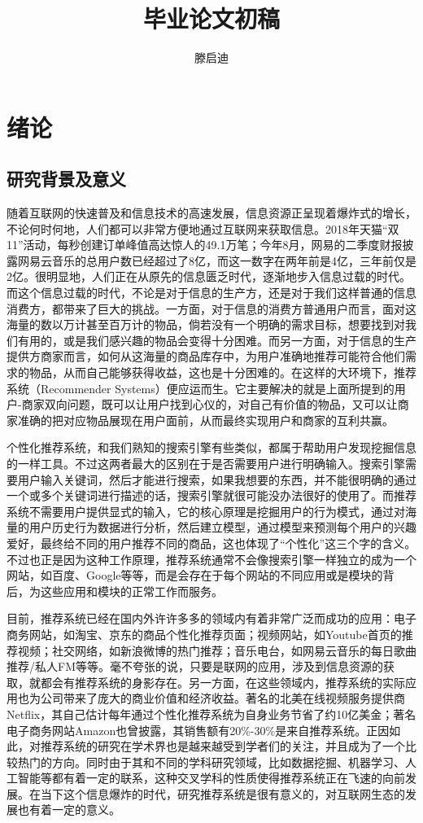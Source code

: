 \documentclass{article}
\title{毕业论文初稿}
\author{滕启迪}
\begin{document}
\maketitle
\tableofcontents
\newpage
\section{绪论}
	\subsection{研究背景及意义}
	随着互联网的快速普及和信息技术的高速发展，信息资源正呈现着爆炸式的增长，不论何时何地，人们都可以非常方便地通过互联网来获取信息。2018年天猫“双11”活动，每秒创建订单峰值高达惊人的49.1万笔；今年8月，网易的二季度财报披露网易云音乐的总用户数已经超过了8亿，而这一数字在两年前是4亿，三年前仅是2亿。很明显地，人们正在从原先的信息匮乏时代，逐渐地步入信息过载的时代。而这个信息过载的时代，不论是对于信息的生产方，还是对于我们这样普通的信息消费方，都带来了巨大的挑战。一方面，对于信息的消费方普通用户而言，面对这海量的数以万计甚至百万计的物品，倘若没有一个明确的需求目标，想要找到对我们有用的，或是我们感兴趣的物品会变得十分困难。而另一方面，对于信息的生产提供方商家而言，如何从这海量的商品库存中，为用户准确地推荐可能符合他们需求的物品，从而自己能够获得收益，这也是十分困难的。在这样的大环境下，推荐系统（Recommender Systems）便应运而生。它主要解决的就是上面所提到的用户-商家双向问题，既可以让用户找到心仪的，对自己有价值的物品，又可以让商家准确的把对应物品展现在用户面前，从而最终实现用户和商家的互利共赢。

	个性化推荐系统，和我们熟知的搜索引擎有些类似，都属于帮助用户发现挖掘信息的一样工具。不过这两者最大的区别在于是否需要用户进行明确输入。搜索引擎需要用户输入关键词，然后才能进行搜索，如果我想要的东西，并不能很明确的通过一个或多个关键词进行描述的话，搜索引擎就很可能没办法很好的使用了。而推荐系统不需要用户提供显式的输入，它的核心原理是挖掘用户的行为模式，通过对海量的用户历史行为数据进行分析，然后建立模型，通过模型来预测每个用户的兴趣爱好，最终给不同的用户推荐不同的商品，这也体现了“个性化”这三个字的含义。不过也正是因为这种工作原理，推荐系统通常不会像搜索引擎一样独立的成为一个网站，如百度、Google等等，而是会存在于每个网站的不同应用或是模块的背后，为这些应用和模块的正常工作而服务。

	目前，推荐系统已经在国内外许许多多的领域内有着非常广泛而成功的应用：电子商务网站，如淘宝、京东的商品个性化推荐页面；视频网站，如Youtube首页的推荐视频；社交网络，如新浪微博的热门推荐；音乐电台，如网易云音乐的每日歌曲推荐/私人FM等等。毫不夸张的说，只要是联网的应用，涉及到信息资源的获取，就都会有推荐系统的身影存在。另一方面，在这些领域内，推荐系统的实际应用也为公司带来了庞大的商业价值和经济收益。著名的北美在线视频服务提供商Netflix，其自己估计每年通过个性化推荐系统为自身业务节省了约10亿美金；著名电子商务网站Amazon也曾披露，其销售额有20\%-30\%是来自推荐系统。正因如此，对推荐系统的研究在学术界也是越来越受到学者们的关注，并且成为了一个比较热门的方向。同时由于其和不同的学科研究领域，比如数据挖掘、机器学习、人工智能等都有着一定的联系，这种交叉学科的性质使得推荐系统正在飞速的向前发展。在当下这个信息爆炸的时代，研究推荐系统是很有意义的，对互联网生态的发展也有着一定的意义。
\end{document}
